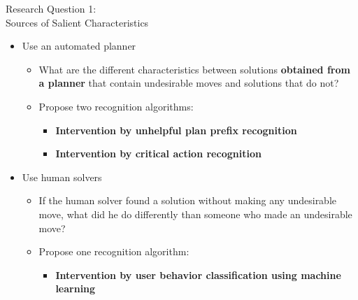 \begin{frame}{Research Question 1: \\Sources of Salient Characteristics}
\begin{itemize}
\item Use an automated planner
\begin{itemize}
\item What are the different characteristics between solutions \textbf{ obtained from a planner} that contain undesirable moves and solutions that do not?
\item Propose two recognition algorithms:
\begin{itemize}
\item \textbf{Intervention by unhelpful plan prefix recognition}
\item \textbf{Intervention by critical action recognition}
\end{itemize}
\end{itemize}
\item Use human solvers
\begin{itemize}
\item If the human solver found a solution without making any undesirable move, what did he do differently than someone who made an undesirable move?
\item Propose one recognition algorithm:
\begin{itemize}
\item \textbf{Intervention by user behavior classification using machine learning}
\end{itemize}
\end{itemize}
\end{itemize}

\end{frame}